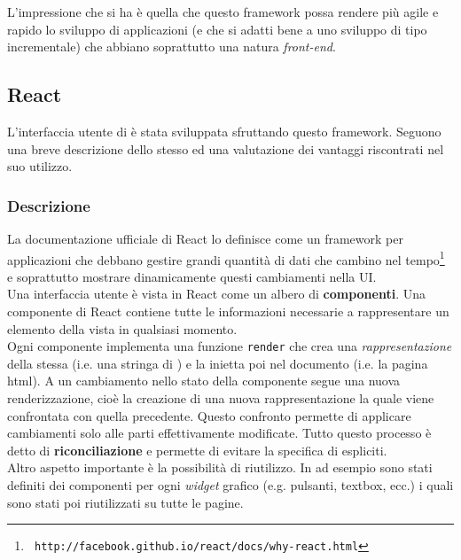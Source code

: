 L'impressione che si ha è quella che questo framework possa rendere più agile e rapido
lo sviluppo di applicazioni (e che si adatti bene a uno sviluppo di tipo incrementale)
che abbiano soprattutto una natura \textit{front-end}.

\subsection{React}\label{react}

L'interfaccia utente di \fiscoloMobile{} è stata sviluppata sfruttando
questo framework. Seguono una breve descrizione dello stesso ed una valutazione
dei vantaggi riscontrati nel suo utilizzo.

\subsubsection{Descrizione}\label{descrizione-react}
La documentazione ufficiale di React lo definisce come un framework per applicazioni
che debbano gestire grandi quantità di dati che cambino nel tempo\footnote{\texttt{ http://facebook.github.io/react/docs/why-react.html}} e soprattutto
mostrare dinamicamente questi cambiamenti nella UI. \\

Una interfaccia utente è vista in React come un albero di \textbf{componenti}.
Una componente di React contiene tutte le informazioni necessarie a rappresentare
un elemento della vista in qualsiasi momento. \\

Ogni componente implementa una funzione \texttt{render} che crea una
\textit{rappresentazione} della stessa (i.e. una stringa di ) e la inietta
poi nel documento (i.e. la pagina html). A un cambiamento nello stato della componente
segue una nuova renderizzazione, cioè la creazione di una nuova rappresentazione la quale
viene confrontata con quella precedente. Questo confronto permette di applicare
cambiamenti solo alle parti effettivamente modificate. Tutto questo processo è detto
di \textbf{riconciliazione} e permette di evitare la specifica di
\textit{} espliciti. \\

Altro aspetto importante è la possibilità di riutilizzo. In \fiscoloMobile{} 
ad esempio sono stati definiti dei componenti per ogni \textit{widget} grafico (e.g.
pulsanti, textbox, ecc.) i quali sono stati poi riutilizzati su tutte le pagine. \\

